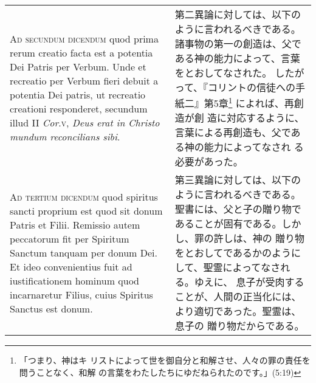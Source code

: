\documentclass[10pt]{jsarticle} %
\begin{document}
\begin{longtable}{p{21em}p{21em}}
\\



{\scshape Ad secundum dicendum} quod prima rerum creatio facta est a potentia Dei
Patris per Verbum. Unde et recreatio per Verbum fieri debuit a potentia
Dei patris, ut recreatio creationi responderet, secundum illud II
{\itshape Cor}.{\scshape v}, {\itshape Deus erat in Christo mundum reconcilians sibi}.

&

第二異論に対しては、以下のように言われるべきである。
諸事物の第一の創造は、父である神の能力によって、言葉をとおしてなされた。
 したがって、『コリントの信徒への手紙二』第5章\footnote{「つまり、神はキ
 リストによって世を御自分と和解させ、人々の罪の責任を問うことなく、和解
 の言葉をわたしたちにゆだねられたのです。」(5:19)} によれば、再創造が創
 造に対応するように、言葉による再創造も、父である神の能力によってなされ
 る必要があった。

\\



{\scshape Ad tertium dicendum} quod spiritus sancti proprium est quod sit donum
Patris et Filii. Remissio autem peccatorum fit per Spiritum Sanctum
tanquam per donum Dei. Et ideo convenientius fuit ad iustificationem
hominum quod incarnaretur Filius, cuius Spiritus Sanctus est donum.

&

第三異論に対しては、以下のように言われるべきである。
聖書には、父と子の贈り物であることが固有である。しかし、罪の許しは、神の
 贈り物をとおしてであるかのようにして、聖霊によってなされる。ゆえに、
息子が受肉することが、人間の正当化には、より適切であった。聖霊は、息子の
 贈り物だからである。



\end{longtable}
\newpage
\end{document}
